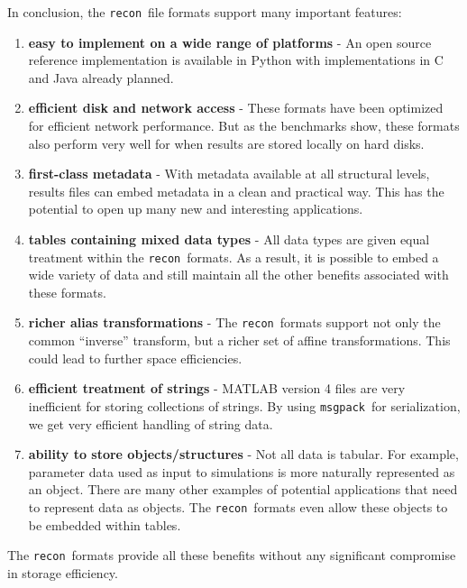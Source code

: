 \documentclass[11pt,a4paper,twocolumn]{article}
\newcommand{\recon}{\texttt{recon}}
\newcommand{\msgpack}{\texttt{msgpack}}
\begin{document}
In conclusion, the \recon\ file formats support many important features:
\begin{enumerate}
\item \textbf{easy to implement on a wide range of platforms} - An open
  source reference implementation is available in Python with
  implementations in C and Java already planned.
\item \textbf{efficient disk and network access} - These formats have been
  optimized for efficient network performance.  But as the benchmarks
  show, these formats also perform very well for when results are
  stored locally on hard disks.
\item \textbf{first-class metadata} - With metadata available at all
  structural levels, results files can embed metadata in a clean and
  practical way.  This has the potential to open up many new and
  interesting applications.
\item \textbf{tables containing mixed data types} - All data types are
  given equal treatment within the \recon\ formats.  As a result, it
  is possible to embed a wide variety of data and still maintain all
  the other benefits associated with these formats.
\item \textbf{richer alias transformations} - The \recon\ formats support
  not only the common ``inverse'' transform, but a richer set of
  affine transformations.  This could lead to further space
  efficiencies.
\item \textbf{efficient treatment of strings} - MATLAB version 4 files are
  very inefficient for storing collections of strings.  By using
  \msgpack\ for serialization, we get very efficient handling of
  string data.
\item \textbf{ability to store objects/structures} - Not all data is
  tabular.  For example, parameter data used as input to simulations
  is more naturally represented as an object.  There are many other
  examples of potential applications that need to represent data as
  objects.  The \recon\ formats even allow these objects to be
  embedded within tables.
\end{enumerate}

The \recon\ formats provide all these benefits without any significant
compromise in storage efficiency.


\end{document}
